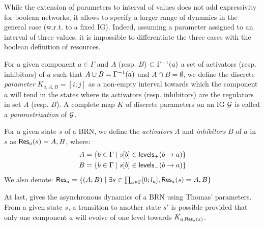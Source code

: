 While the extension of parameters to interval of values does not add expressivity for boolean
networks, it allows to specify a larger range of dynamics in the general case (w.r.t. to a fixed
IG).
Indeed, assuming a parameter assigned to an interval of three values, it is impossible to
differentiate the three cases with the boolean definition of resources.


\begin{definition}\label{def:param}
For a given component $a \in \Gamma$ and $A$ (resp. $B$) $\subset \Gamma^{-1}(a)$ a set of activators (resp. inhibitors) of $a$ such that
$A \cup B = \Gamma^{-1}(a)$ and $A \cap B = \emptyset$,
we define the discrete \emph{parameter} $K_{a,A,B} = [i; j]$ as a non-empty interval towards which the component $a$ will tend
in the states where its activators (resp. inhibitors) are the regulators in set $A$ (resp. $B$).
A complete map $K$ of discrete parameters on an IG $\mathcal{G}$ is called a \emph{parametrization} of $\mathcal{G}$.
\end{definition}

\begin{definition}\label{def:resources}
For a given state $s$ of a BRN, we define the \emph{activators} $A$ and \emph{inhibitors} $B$ of $a$ in $s$ as $\mathsf{Res}_{a}(s) = A,B$, where:
\begin{align*}
  A &= \{b \in \Gamma \mid {s[b]} \in \mathsf{levels}_+(b\rightarrow a)\} \\
  B &= \{b \in \Gamma \mid {s[b]} \in \mathsf{levels}_-(b\rightarrow a)\}
\end{align*}
We also denote: $\mathsf{Res}_{a} = \{(A;B) \mid \exists s \in \textstyle\prod_{a \in \Gamma} [0;l_a], \mathsf{Res}_{a}(s) = A,B\}$
\end{definition}


At last,  gives the asynchronous dynamics of a BRN using Thomas' parameters.
From a given state $s$, a transition to another state $s'$ is possible provided that only one component $a$ will evolve of one level towards $K_{a,\mathsf{Res}_{a}(s)}$.

